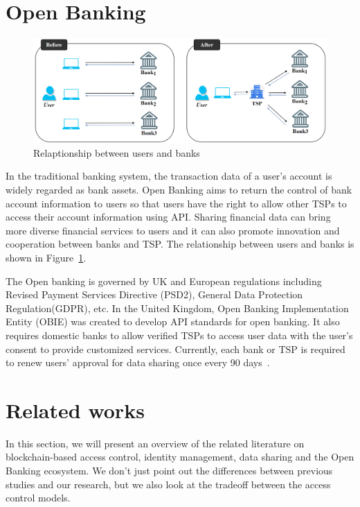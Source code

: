\newpage

\section{Open Banking}
\begin{figure}[htb]
    \centering
    \includegraphics[height=!,width=1\linewidth,keepaspectratio=true]{figures/tsp_flow.png}
    \caption{{\footnotesize Relaptionship between users and banks}}
    \label{fig:tsp_flow}
\end{figure}
In the traditional banking system, the transaction data of a user's account is widely regarded as bank assets. Open Banking aims to return the control of bank account information to users so that users have the right to allow other TSPs to access their account information using API. Sharing financial data can bring more diverse financial services to users and it can also promote innovation and cooperation between banks and TSP. The relationship between users and banks is shown in Figure~\ref{fig:tsp_flow}.
\par
The Open banking is governed by UK and European regulations including Revised Payment Services Directive (PSD2), General Data Protection Regulation(GDPR), etc. In the United Kingdom, Open Banking Implementation Entity (OBIE) was created to develop API standards for open banking. It also requires domestic banks to allow verified TSPs to access user data with the user's consent to provide customized services. Currently, each bank or TSP is required to renew users' approval for data sharing once every 90 days~\cite{morton}. 

\newpage

\section{Related works}
In this section, we will present an overview of the related literature on blockchain-based access control, identity management, data sharing and the Open Banking ecosystem. We don't just point out the differences between previous studies and our research, but we also look at the tradeoff between the access control models.
